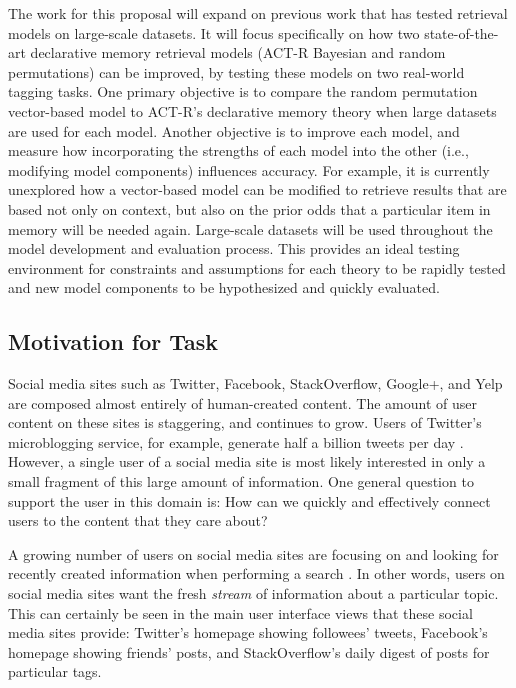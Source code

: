 \documentclass[man,floatsintext,donotrepeattitle]{apa6}
\begin{document}
The work for this proposal will expand on previous work that has tested retrieval models on large-scale datasets.
It will focus specifically on how two state-of-the-art declarative memory retrieval models (ACT-R Bayesian and random permutations) can be improved, by testing these models on two real-world tagging tasks.
One primary objective is to compare the random permutation vector-based model to ACT-R's declarative memory theory when large datasets are used for each model. 
Another objective is to improve each model, and measure how incorporating the strengths of each model into the other (i.e., modifying model components) influences accuracy.
For example, it is currently unexplored how a vector-based model can be modified to retrieve results that are based not only on context, but also on the prior odds that a particular item in memory will be needed again.
Large-scale datasets will be used throughout the model development and evaluation process.
This provides an ideal testing environment for constraints and assumptions for each theory to be rapidly tested and new model components to be hypothesized and quickly evaluated.

\subsection{Motivation for Task}

Social media sites such as Twitter, Facebook, StackOverflow, Google+, and Yelp are composed almost entirely of human-created content.
The amount of user content on these sites is staggering, and continues to grow.
Users of Twitter's microblogging service, for example, generate half a billion tweets per day \parencite{TwitterReport2012}.
However, a single user of a social media site is most likely interested in only a small fragment of this large amount of information.
One general question to support the user in this domain is:
How can we quickly and effectively connect users to the content that they care about?

A growing number of users on social media sites are focusing on and looking for recently created information when performing a search \parencite{Jansen2011}.
In other words, users on social media sites want the fresh \emph{stream} of information about a particular topic.
This can certainly be seen in the main user interface views that these social media sites provide:
Twitter's homepage showing followees' tweets, Facebook's homepage showing friends' posts, and StackOverflow's daily digest of posts for particular tags.
\end{document}
